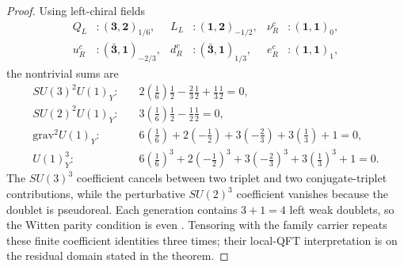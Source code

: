 \documentclass[12pt,a4paper]{article}
\begin{document}
\begin{proof}
Using left-chiral fields
\[
\begin{aligned}
Q_L&:(\mathbf3,\mathbf2)_{1/6}, &
L_L&:(\mathbf1,\mathbf2)_{-1/2}, &
\nu_R^c&:(\mathbf1,\mathbf1)_0,\\
u_R^c&:(\bar{\mathbf3},\mathbf1)_{-2/3}, &
d_R^c&:(\bar{\mathbf3},\mathbf1)_{1/3}, &
e_R^c&:(\mathbf1,\mathbf1)_1,
\end{aligned}
\]
the nontrivial sums are
\begin{align}
SU(3)^2U(1)_Y:&\quad
2\left(\frac16\right)\frac12-\frac23\frac12+\frac13\frac12=0,\\
SU(2)^2U(1)_Y:&\quad
3\left(\frac16\right)\frac12-\frac12\frac12=0,\\
\mathrm{grav}^2U(1)_Y:&\quad
6\left(\frac16\right)+2\left(-\frac12\right)+3\left(-\frac23\right)+3\left(\frac13\right)+1=0,\\
U(1)_Y^3:&\quad
6\left(\frac16\right)^3+2\left(-\frac12\right)^3+3\left(-\frac23\right)^3+3\left(\frac13\right)^3+1=0.
\end{align}
The \(SU(3)^3\) coefficient cancels between two triplet and two conjugate-triplet
contributions, while the perturbative \(SU(2)^3\) coefficient vanishes because
the doublet is pseudoreal.  Each generation contains \(3+1=4\) left weak
doublets, so the Witten parity condition is even
\cite{Witten1982SU2Anomaly}.  Tensoring with the family carrier repeats these
finite coefficient identities three times; their local-QFT interpretation is
on the residual domain stated in the theorem.
\end{proof}
\end{document}
